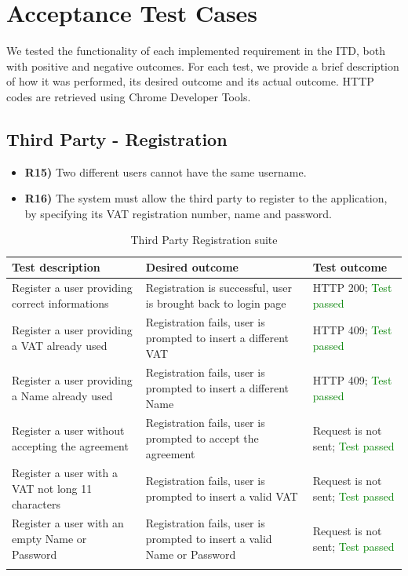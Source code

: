 \documentclass[titlepage]{article}
\begin{document}
\pagebreak
\section{Acceptance Test Cases}
We tested the functionality of each implemented requirement in the ITD, both with positive and negative outcomes. For each test, we provide a brief description of how it was performed, its desired outcome and its actual outcome. \newline
HTTP codes are retrieved using Chrome Developer Tools. 

\subsection{Third Party - Registration}
\begin{itemize}
    \item {\bf R15)} Two different users cannot have the same username.
    \item {\bf R16)} The system must allow the third party to register to the application, by specifying its VAT registration number, name and password.
\end{itemize}

\renewcommand*{\arraystretch}{1.4}
\begin{longtable}{| p{3 cm} | p{4 cm} | p{4 cm} |} \hline
    {\bf Test description} & {\bf Desired outcome} & {\bf Test outcome} \\ \hline
    Register a user providing correct informations & 
    Registration is successful, user is brought back to login page
        & HTTP 200; \textcolor{green}{Test passed} \\ \hline
    Register a user providing a VAT already used & 
    Registration fails, user is prompted to insert a different VAT
        & HTTP 409; \textcolor{green}{Test passed} \\ \hline
    Register a user providing a Name already used & 
    Registration fails, user is prompted to insert a different Name
        & HTTP 409; \textcolor{green}{Test passed} \\ \hline
    Register a user without accepting the agreement & 
    Registration fails, user is prompted to accept the agreement
        & Request is not sent; \textcolor{green}{Test passed} \\ \hline
    Register a user with a VAT not long 11 characters & 
    Registration fails, user is prompted to insert a valid VAT
        & Request is not sent; \textcolor{green}{Test passed} \\ \hline
    Register a user with an empty Name or Password & 
    Registration fails, user is prompted to insert a valid Name or Password
        & Request is not sent; \textcolor{green}{Test passed} \\ \hline
    \caption{Third Party Registration suite}
\end{longtable}
\end{document}
